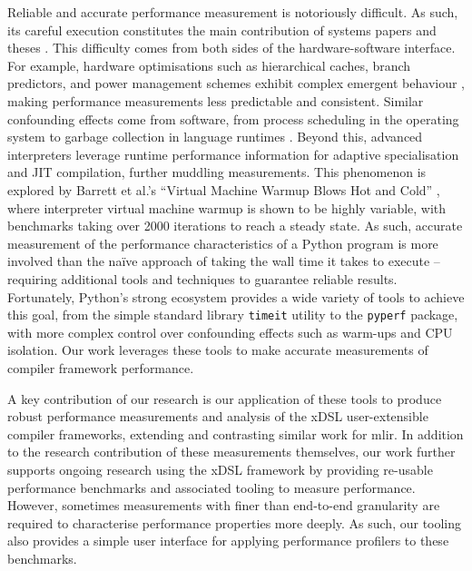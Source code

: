 Reliable and accurate performance measurement is notoriously difficult.
As such, its careful execution constitutes the main contribution of systems papers and theses \cite{crapeperformance} \cite{harris2021understanding}.
This difficulty comes from both sides of the hardware-software interface.
For example, hardware optimisations such as hierarchical caches, branch predictors, and power management schemes exhibit complex emergent behaviour \cite{hennessyComputerArchitectureQuantitative2012}, making performance measurements less predictable and consistent. Similar confounding effects come from software, from process scheduling in the operating system to garbage collection in language runtimes \cite{blackburnMythsRealitiesPerformance2004}.
Beyond this, advanced interpreters leverage runtime performance information for adaptive specialisation and JIT compilation, further muddling measurements. This phenomenon is explored by Barrett et al.'s ``Virtual Machine Warmup Blows Hot and Cold'' \cite{barrettVirtualMachineWarmup2017}, where interpreter virtual machine warmup is shown to be highly variable, with benchmarks taking over 2000 iterations to reach a steady state.
As such, accurate measurement of the performance characteristics of a Python program is more involved than the na\"ive approach of taking the wall time it takes to execute -- requiring additional tools and techniques to guarantee reliable results.
Fortunately, Python's strong ecosystem provides a wide variety of tools to achieve this goal, from the simple standard library \texttt{timeit} utility to the \texttt{pyperf} \cite{victorstinnerPsfPyperf2025} package, with more complex control over confounding effects such as warm-ups and CPU isolation.
Our work leverages these tools to make accurate measurements of compiler framework performance.

A key contribution of our research is our application of these tools to produce robust performance measurements and analysis of the xDSL user-extensible compiler frameworks, extending and contrasting similar work for \ac{mlir}.
In addition to the research contribution of these measurements themselves, our work further supports ongoing research using the xDSL framework by providing re-usable performance benchmarks and associated tooling to measure performance.
However, sometimes measurements with finer than end-to-end granularity are required to characterise performance properties more deeply. As such, our tooling also provides a simple user interface for applying performance profilers to these benchmarks.


